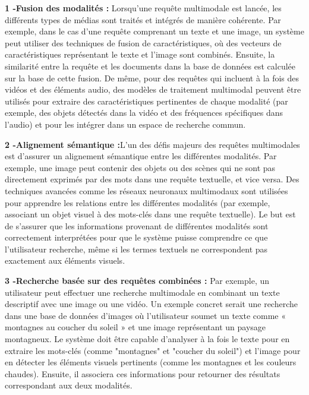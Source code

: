 \begin{section}
 \textbf{1 -Fusion des modalités :} Lorsqu'une requête multimodale est lancée, les différents types de médias sont
 traités et intégrés de manière cohérente. Par exemple, dans le cas d’une
 requête comprenant un texte et une image, un système peut utiliser des
 techniques de fusion de caractéristiques, où des vecteurs de caractéristiques
 représentant le texte et l'image sont combinés. Ensuite, la similarité entre la
 requête et les documents dans la base de données est calculée sur la base de
 cette fusion. De même, pour des requêtes qui incluent à la fois des vidéos et
 des éléments audio, des modèles de traitement multimodal peuvent être utilisés
 pour extraire des caractéristiques pertinentes de chaque modalité (par exemple,
 des objets détectés dans la vidéo et des fréquences spécifiques dans l'audio)
 et pour les intégrer dans un espace de recherche commun.
 \par
 \textbf{2 -Alignement sémantique :}L'un des défis majeurs des requêtes multimodales est d'assurer un alignement
 sémantique entre les différentes modalités. Par exemple, une image peut contenir des objets ou des scènes qui
 ne sont pas directement exprimés par des mots dans une requête textuelle, et vice versa. Des techniques avancées
 comme les réseaux neuronaux multimodaux sont utilisées pour apprendre les relations entre les différentes modalités
 (par exemple, associant un objet visuel à des mots-clés dans une requête textuelle).
 Le but est de s'assurer que les informations provenant de différentes modalités sont correctement interprétées pour
 que le système puisse comprendre ce que l'utilisateur recherche, même si les termes textuels ne correspondent
 pas exactement aux éléments visuels.

 \par
 \textbf{3 -Recherche basée sur des requêtes combinées :}
 Par exemple, un utilisateur peut effectuer une recherche multimodale en combinant un texte descriptif avec une
 image ou une vidéo. Un exemple concret serait une recherche dans une base de données d'images où l'utilisateur
 soumet un texte comme « montagnes au coucher du soleil » et une image représentant un paysage montagneux.
 Le système doit être capable d'analyser à la fois le texte pour en extraire les mots-clés (comme "montagnes" et
 "coucher du soleil") et l'image pour en détecter les éléments visuels pertinents (comme les montagnes et les
 couleurs chaudes). Ensuite, il associera ces informations pour retourner des résultats correspondant aux deux
 modalités.

 \par


\end{section}
